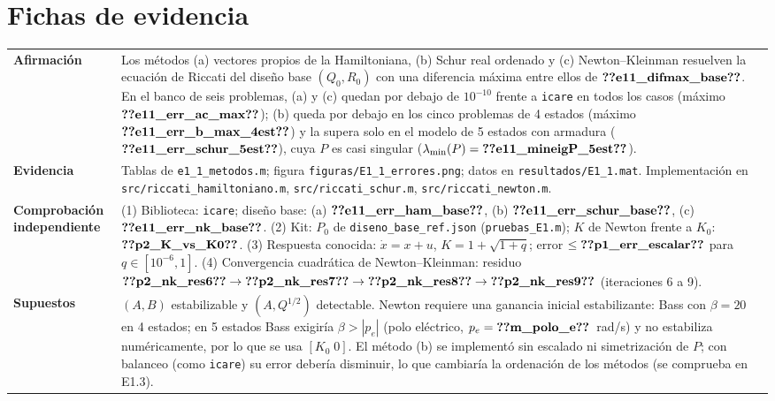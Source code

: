 \section{Fichas de evidencia}

\begin{recuadro}[title=Ficha de evidencia — E1.1: tres métodos de solución de la ecuación de Riccati]
\begin{tabularx}{\linewidth}{@{}>{\bfseries}p{3.1cm} >{\raggedright\arraybackslash}X@{}}
Afirmación &
Los métodos (a) vectores propios de la Hamiltoniana, (b) Schur real ordenado y (c) Newton--Kleinman
resuelven la ecuación de Riccati del diseño base $(Q_0,R_0)$ con una diferencia máxima entre ellos de
$\V{e11_difmax_base}$. En el banco de seis problemas, (a) y (c) quedan por debajo de $10^{-10}$ frente a
\texttt{icare} en todos los casos (máximo $\V{e11_err_ac_max}$); (b) queda por debajo en los cinco problemas
de 4 estados (máximo $\V{e11_err_b_max_4est}$) y la supera solo en el modelo de 5 estados con armadura
($\V{e11_err_schur_5est}$), cuya $P$ es casi singular ($\lambda_{\min}(P)=\V{e11_mineigP_5est}$). \\[3pt]
Evidencia &
Tablas de \texttt{e1\_1\_metodos.m}; figura \texttt{figuras/E1\_1\_errores.png};
datos en \texttt{resultados/E1\_1.mat}. Implementación en \texttt{src/riccati\_hamiltoniano.m},
\texttt{src/riccati\_schur.m}, \texttt{src/riccati\_newton.m}. \\[3pt]
Comprobación independiente &
(1) Biblioteca: \texttt{icare}; diseño base: (a) $\V{e11_err_ham_base}$, (b) $\V{e11_err_schur_base}$,
(c) $\V{e11_err_nk_base}$.
(2) Kit: $P_0$ de \texttt{diseno\_base\_ref.json} (\texttt{pruebas\_E1.m}); $K$ de Newton frente a
$K_0$: $\V{p2_K_vs_K0}$.
(3) Respuesta conocida: $\dot x=x+u$, $K=1+\sqrt{1+q}$; error $\le \V{p1_err_escalar}$ para
$q\in[10^{-6},1]$.
(4) Convergencia cuadrática de Newton--Kleinman: residuo
$\V{p2_nk_res6}\to\V{p2_nk_res7}\to\V{p2_nk_res8}\to\V{p2_nk_res9}$ (iteraciones 6 a 9). \\[3pt]
Supuestos &
$(A,B)$ estabilizable y $(A,Q^{1/2})$ detectable. Newton requiere una ganancia inicial
estabilizante: Bass con $\beta=20$ en 4 estados; en 5 estados Bass exigiría $\beta>|p_e|$ (polo eléctrico,
$p_e=\V{m_polo_e}$~rad/s) y no estabiliza numéricamente, por lo que se usa $[K_0\;0]$. El método (b) se
implementó sin escalado ni simetrización de $P$; con balanceo (como \texttt{icare}) su error debería
disminuir, lo que cambiaría la ordenación de los métodos (se comprueba en E1.3).
\end{tabularx}
\end{recuadro}

